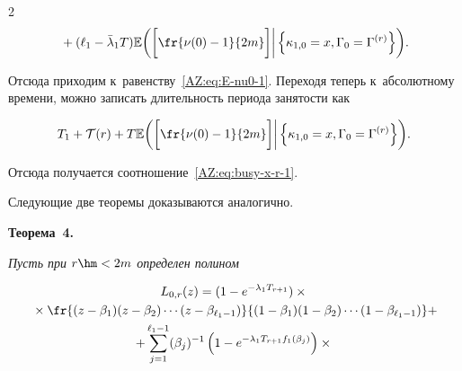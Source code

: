 \begin{multicols}{2}
\begin{multline*}
  {} +

  (\ell_1-\bar\lambda_{1}T)  \mathbb{E}\biggl(\biggl[\fr{\nu(0)-1}{2m}\biggr]

  \bigg| \left\{\kappa_{1,0}=x,\Gamma_{0}=\Gamma^{(r)}\right\}\biggr).\hspace*{-0.5pt}

\end{multline*}



\vspace*{-4pt}



\noindent

Отсюда приходим к~равенству~\eqref{AZ:eq:E-nu0-1}.  Переходя теперь к~абсолютному времени, можно записать длительность периода занятости как

$$

  T_{1}+\mathcal T(r)+

  T\mathbb{E}\biggl(\biggl[\fr{\nu(0)-1}{2m}\biggr]

  \bigg| \left\{\kappa_{1,0}=x,\Gamma_{0}=\Gamma^{(r)}\right\}\biggr).

$$

Отсюда получается соотношение~\eqref{AZ:eq:busy-x-r-1}.










Следующие две теоремы доказываются аналогично.



\noindent

\textbf{Теорема~4.}\

\textit{Пусть при $r\hm<2m$ определен полином}

    \begin{multline*}

      L_{0,r}(z)=(1-e^{-\lambda_1 T_{r+1}})\times{}\\

      {}\times

      \fr{(z-\beta_{1})(z-\beta_2)\cdots(z-\beta_{\ell_1-1})}%

    {(1-\beta_{1})(1-\beta_2)\cdots(1-\beta_{\ell_1-1})}+\\

    +\sum\limits_{j=1}^{\ell_1-1}(\beta_{j})^{-1}

    \left(1-e^{-\lambda_1 T_{r+1}f_1(\beta_j)}\right)\times{}\\


\end{multline*}
\end{multicols}
